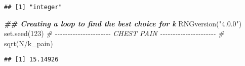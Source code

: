 \documentclass[
]{article}
\newenvironment{Shaded}{\begin{snugshade}}{\end{snugshade}}
\newcommand{\AttributeTok}[1]{\textcolor[rgb]{0.77,0.63,0.00}{#1}}
\newcommand{\CommentTok}[1]{\textcolor[rgb]{0.56,0.35,0.01}{\textit{#1}}}
\newcommand{\DecValTok}[1]{\textcolor[rgb]{0.00,0.00,0.81}{#1}}
\newcommand{\DocumentationTok}[1]{\textcolor[rgb]{0.56,0.35,0.01}{\textbf{\textit{#1}}}}
\newcommand{\FunctionTok}[1]{\textcolor[rgb]{0.00,0.00,0.00}{#1}}
\newcommand{\NormalTok}[1]{#1}
\newcommand{\OtherTok}[1]{\textcolor[rgb]{0.56,0.35,0.01}{#1}}
\newcommand{\SpecialCharTok}[1]{\textcolor[rgb]{0.00,0.00,0.00}{#1}}
\newcommand{\StringTok}[1]{\textcolor[rgb]{0.31,0.60,0.02}{#1}}
\begin{document}
\begin{verbatim}
## [1] "integer"
\end{verbatim}

\begin{Shaded}
\end{Shaded}

\begin{Shaded}
\begin{Highlighting}[]
\DocumentationTok{\#\# Creating a loop to find the best choice for k}
\FunctionTok{RNGversion}\NormalTok{(}\StringTok{"4.0.0"}\NormalTok{)}
\FunctionTok{set.seed}\NormalTok{(}\DecValTok{123}\NormalTok{)}
\CommentTok{\# {-}{-}{-}{-}{-}{-}{-}{-}{-}{-}{-}{-}{-}{-}{-}{-}{-}{-}{-}{-}{-}{-} CHEST PAIN {-}{-}{-}{-}{-}{-}{-}{-}{-}{-}{-}{-}{-}{-}{-}{-}{-}{-}{-}{-}{-}{-} \#}
\FunctionTok{sqrt}\NormalTok{(N}\SpecialCharTok{/}\NormalTok{k\_pain)}
\end{Highlighting}
\end{Shaded}

\begin{verbatim}
## [1] 15.14926
\end{verbatim}
\end{document}
